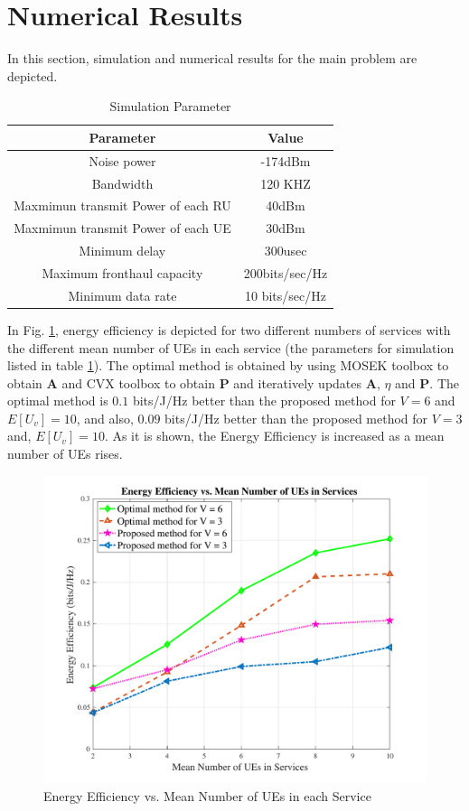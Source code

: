 \documentclass[conference]{IEEEtran}
\begin{document}
\section{Numerical Results}\label{simul}
In this section, simulation and numerical results for the main problem are depicted.
 \begin{table}
 \caption {Simulation Parameter} \label{table:1a}
 \begin{center}
  \begin{tabular}{||c c ||}
  \hline
Parameter & Value \\ [0.5ex]
  \hline\hline
  Noise power & -174dBm\\
  \hline
  Bandwidth & 120 KHZ \\
  \hline
 Maxmimun transmit Power of each RU & 40dBm \\
  \hline
   Maxmimun transmit Power of each UE & 30dBm \\
  \hline
  Minimum delay &  300usec \\
  \hline
  Maximum fronthaul capacity  & 200bits/sec/Hz \\
   \hline
  Minimum data rate &  10 bits/sec/Hz \\ [1ex]
  \hline
 \end{tabular}
 \end{center}
 \end{table}
In Fig. \ref{fig:f1a}, energy efficiency is depicted for two different numbers of services with the different mean number of UEs in each service (the parameters for simulation listed in table \ref{table:1a}). The optimal method is obtained by using MOSEK toolbox to obtain $\boldsymbol{A}$ and CVX toolbox to obtain $\boldsymbol{P}$ and iteratively updates $\boldsymbol{A}$, $\eta$ and $\boldsymbol{P}$. The optimal method is $0.1$ bits/J/Hz better than the proposed method for $V = 6$ and $E[U_v] = 10$, and also, $0.09$ bits/J/Hz better than the proposed method for $V = 3$ and, $E[U_v] = 10$. As it is shown, the Energy Efficiency is increased as a mean number of UEs rises.
\begin{figure}%
  \centering
    \includegraphics[width=\linewidth]{fig1_last}
  \caption{Energy Efficiency vs. Mean Number of UEs in each Service}
  \label{fig:f1a}
\end{figure}
\end{document}
